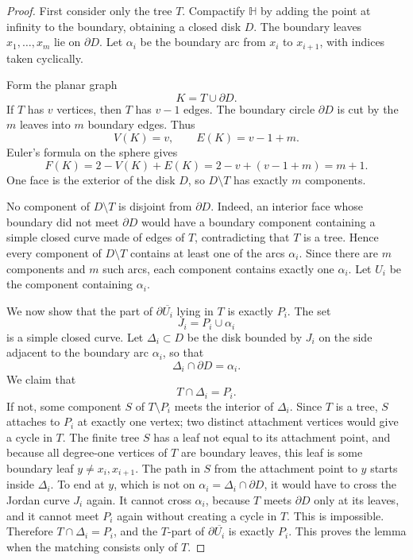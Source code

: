 \documentclass[12pt]{article}
\newcommand{\HH}{\mathbb{H}}
\newcommand{\bd}{\partial}
\theoremstyle{definition}
\begin{document}
\begin{proof}
First consider only the tree \(T\).  Compactify \(\HH\) by adding the point at infinity to the boundary, obtaining a closed disk \(D\).  The boundary leaves \(x_1,\dots,x_m\) lie on \(\bd D\).  Let \(\alpha_i\) be the boundary arc from \(x_i\) to \(x_{i+1}\), with indices taken cyclically.

Form the planar graph
\[
K=T\cup \bd D.
\]
If \(T\) has \(v\) vertices, then \(T\) has \(v-1\) edges.  The boundary circle \(\bd D\) is cut by the \(m\) leaves into \(m\) boundary edges.  Thus
\[
V(K)=v,\qquad E(K)=v-1+m.
\]
Euler's formula on the sphere gives
\[
F(K)=2-V(K)+E(K)=2-v+(v-1+m)=m+1.
\]
One face is the exterior of the disk \(D\), so \(D\setminus T\) has exactly \(m\) components.

No component of \(D\setminus T\) is disjoint from \(\bd D\).  Indeed, an interior face whose boundary did not meet \(\bd D\) would have a boundary component containing a simple closed curve made of edges of \(T\), contradicting that \(T\) is a tree.  Hence every component of \(D\setminus T\) contains at least one of the arcs \(\alpha_i\).  Since there are \(m\) components and \(m\) such arcs, each component contains exactly one \(\alpha_i\).  Let \(U_i\) be the component containing \(\alpha_i\).

We now show that the part of \(\bd\overline{U_i}\) lying in \(T\) is exactly \(P_i\).  The set
\[
J_i=P_i\cup \alpha_i
\]
is a simple closed curve.  Let \(\Delta_i\subset D\) be the disk bounded by \(J_i\) on the side adjacent to the boundary arc \(\alpha_i\), so that
\[
\Delta_i\cap \bd D=\alpha_i.
\]
We claim that
\[
T\cap \Delta_i=P_i.
\]
If not, some component \(S\) of \(T\setminus P_i\) meets the interior of \(\Delta_i\).  Since \(T\) is a tree, \(S\) attaches to \(P_i\) at exactly one vertex; two distinct attachment vertices would give a cycle in \(T\).  The finite tree \(S\) has a leaf not equal to its attachment point, and because all degree-one vertices of \(T\) are boundary leaves, this leaf is some boundary leaf \(y\neq x_i,x_{i+1}\).  The path in \(S\) from the attachment point to \(y\) starts inside \(\Delta_i\).  To end at \(y\), which is not on \(\alpha_i=\Delta_i\cap\bd D\), it would have to cross the Jordan curve \(J_i\) again.  It cannot cross \(\alpha_i\), because \(T\) meets \(\bd D\) only at its leaves, and it cannot meet \(P_i\) again without creating a cycle in \(T\).  This is impossible.  Therefore \(T\cap\Delta_i=P_i\), and the \(T\)-part of \(\bd\overline{U_i}\) is exactly \(P_i\).  This proves the lemma when the matching consists only of \(T\).


\end{proof}
\end{document}
